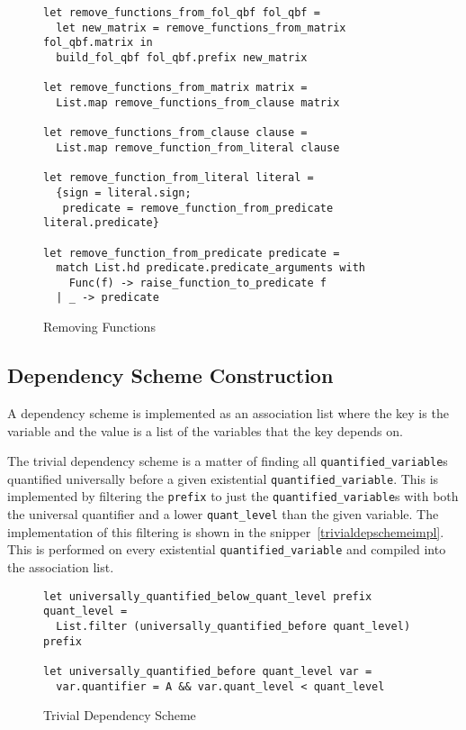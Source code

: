 \begin{figure}[h]
\caption{Removing Functions}
\begin{CenteredBox}
\begin{lstlisting}[language=caml, label=removingfunctionsimpl]
let remove_functions_from_fol_qbf fol_qbf =
  let new_matrix = remove_functions_from_matrix fol_qbf.matrix in
  build_fol_qbf fol_qbf.prefix new_matrix

let remove_functions_from_matrix matrix =
  List.map remove_functions_from_clause matrix

let remove_functions_from_clause clause =
  List.map remove_function_from_literal clause

let remove_function_from_literal literal =
  {sign = literal.sign; 
   predicate = remove_function_from_predicate literal.predicate}

let remove_function_from_predicate predicate =
  match List.hd predicate.predicate_arguments with
    Func(f) -> raise_function_to_predicate f
  | _ -> predicate
\end{lstlisting}
\end{CenteredBox}
\end{figure}

\subsection{Dependency Scheme Construction} \label{devdepscheme}
A dependency scheme is implemented as an association list where the key is the variable and the value is a list of the variables that the key depends on.

The trivial dependency scheme is a matter of finding all \texttt{quantified\_variable}s quantified universally before a given existential \texttt{quantified\_variable}. This is implemented by filtering the \texttt{prefix} to just the \texttt{quantified\_variable}s with both the universal quantifier and a lower \texttt{quant\_level} than the given variable. The implementation of this filtering is shown in the snipper~\ref{trivialdepschemeimpl}. This is performed on every existential \texttt{quantified\_variable} and compiled into the association list.

\begin{figure}[h]
\caption{Trivial Dependency Scheme}
\begin{CenteredBox}
\begin{lstlisting}[language=caml, label=trivialdepschemeimpl]
let universally_quantified_below_quant_level prefix quant_level =
  List.filter (universally_quantified_before quant_level) prefix

let universally_quantified_before quant_level var =
  var.quantifier = A && var.quant_level < quant_level
\end{lstlisting}
\end{CenteredBox}
\end{figure}


